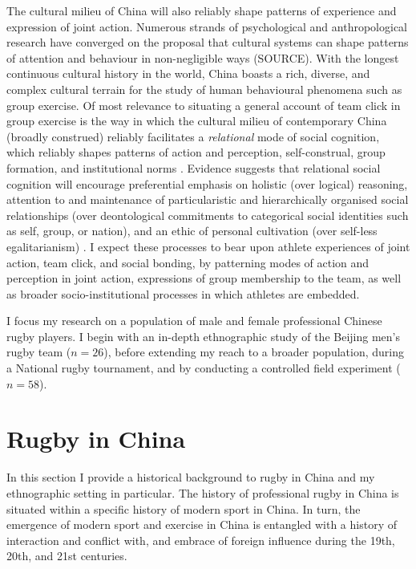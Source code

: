 \begin{CJK}{UTF8}{gbsn}
The cultural milieu of China will also reliably shape patterns of experience and expression of joint action.  Numerous strands of psychological and anthropological research have converged on the proposal that cultural systems can shape patterns of attention and behaviour in non-negligible ways (SOURCE). With the longest continuous cultural history in the world, China boasts a rich, diverse, and complex cultural terrain for the study of human behavioural phenomena such as group exercise. Of most relevance to situating a general account of team click in group exercise is the way in which the cultural milieu of contemporary China (broadly construed) reliably facilitates a \textit{relational} mode of social cognition, which reliably shapes patterns of action and perception, self-construal, group formation, and institutional norms \citep{Nisbett2003}.  Evidence suggests that relational social cognition will encourage preferential emphasis on holistic (over logical) reasoning, attention to and maintenance of particularistic and hierarchically organised social relationships (over deontological commitments to categorical social identities such as self, group, or nation), and an ethic of personal cultivation (over self-less egalitarianism) \citep{Liu2009}.
I expect these processes to bear upon athlete experiences of joint action, team click, and social bonding, by patterning modes of action and perception in joint action, expressions of group membership to the team, as well as broader socio-institutional processes in which athletes are embedded.

I focus my research on a population of male and female professional Chinese rugby players.  I begin with an in-depth ethnographic study of the Beijing men's rugby team ($n = 26$), before extending my reach to a broader population, during a National rugby tournament, and by conducting a controlled field experiment ($n = 58$).


\section{Rugby in China}
In this section I provide a historical background to rugby in China and my ethnographic setting in particular.  The history of professional rugby in China is situated within a specific history of modern sport in China.  In turn, the emergence of modern sport and exercise in China is entangled with a history of interaction and conflict with, and embrace of foreign influence during the 19th, 20th, and 21st centuries.


\end{CJK}
